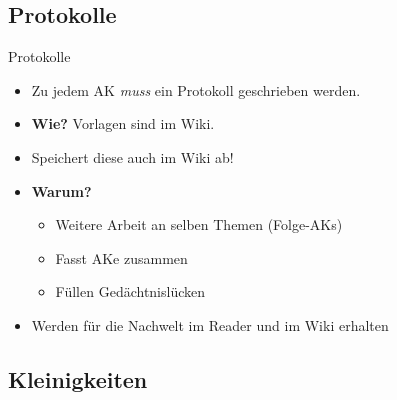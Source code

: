 \documentclass[compress,]{beamer}
\begin{document}
%
%



\subsection{Protokolle}

\begin{frame}{Protokolle}

  \begin{itemize}[<+->]
  \item Zu jedem AK \emph{muss} ein Protokoll geschrieben werden.
  \item \textbf{Wie?} Vorlagen sind im Wiki.

  \item Speichert diese auch im Wiki ab!
  \item \textbf{Warum?}
    \begin{itemize}
    \item Weitere Arbeit an selben Themen (Folge-AKs)
    \item Fasst AKe zusammen
    \item Füllen Gedächtnislücken
    \end{itemize}
  \item Werden für die Nachwelt im Reader und im Wiki erhalten
  \end{itemize}

\end{frame}



\subsection{Kleinigkeiten}
\end{document}
